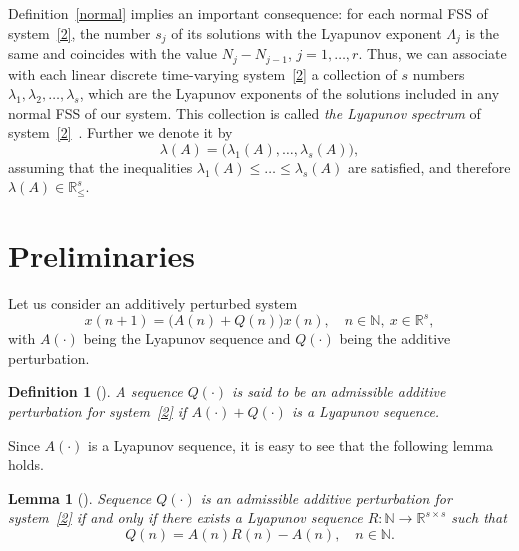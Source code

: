 \documentclass[11pt]{article}
\newtheorem{lemma}[theorem]{Lemma}
\newtheorem{definition}[theorem]{Definition}
\begin{document}
Definition~\ref{normal} implies an important consequence: for each normal
FSS of system~\eqref{2}, the number $s_{j}$ of its solutions with the
Lyapunov exponent $\Lambda _{j}$ is the same and coincides with the value $%
N_{j}-N_{j-1}$, $j=1,\dots ,r$. Thus, we can associate with each linear
discrete  time-varying system~\eqref{2} a collection of $s$ numbers $%
\lambda _{1},\lambda _{2},\ldots ,\lambda _{s}$, which are the Lyapunov
exponents of the solutions included in any normal FSS of our system. This
collection is called \emph{the Lyapunov spectrum} of system~\eqref{2}~\cite%
[p.\,57]{GAI}. Further we denote it by 
\begin{equation*}
\lambda (A)=\bigl(\lambda _{1}(A),\ldots ,\lambda _{s}(A)\bigr),
\end{equation*}%
assuming that the inequalities $\lambda _{1}(A)\le \ldots \le \lambda
_{s}(A)$ are satisfied, and therefore $\lambda (A)\in \mathbb{R}_{\leqslant
}^{s}$.

\section{Preliminaries} \label{sect3}
Let us consider an additively perturbed system%
\begin{equation}
x(n+1)=\bigl(A(n)+Q(n)\bigr)x(n),\quad n\in \mathbb{N},\ x\in \mathbb{R}^{s},
\label{4}
\end{equation}%
with $A( \cdot ) $ being the Lyapunov sequence and $Q(\cdot )$
being the additive perturbation.



\begin{definition}[\protect\cite{BP}]
\label{DopAdd}A sequence $Q(\cdot )$ is said to be \emph{an admissible
additive perturb\-ation} for system~\eqref{2} if $A(\cdot )+Q(\cdot )$ is a
Lyapunov sequence.
\end{definition}

Since $A(\cdot)$ is a Lyapunov sequence, it is easy to see that the following lemma holds.


\begin{lemma}[\protect\cite{BP}]
\label{lem1} 
\it
Sequence $Q(\cdot )$ is an admissible additive perturbation for
system~\eqref{2} if and only if there exists a Lyapunov sequence $R\colon
\mathbb{N}\to \mathbb{R}^{s\times s}$ such that
\begin{equation}
Q(n)=A(n)R(n)-A(n),\quad n\in \mathbb{N}.  \label{M2}
\end{equation}
\end{lemma}
\end{document}

